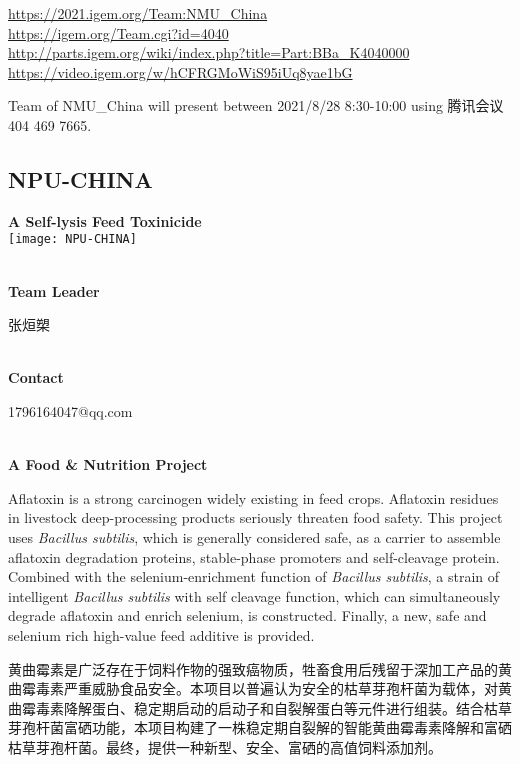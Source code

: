 \url{https://2021.igem.org/Team:NMU\_China }\\
\url{https://igem.org/Team.cgi?id=4040 }\\
\url{http://parts.igem.org/wiki/index.php?title=Part:BBa_K4040000 }\\
\url{https://video.igem.org/w/hCFRGMoWiS95iUq8yae1bG }\\

\vfill{}









Team of NMU\_China will present between    2021/8/28 8:30-10:00     using 腾讯会议 404 469 7665.
\newpage


\subsection{\textcolor{Blu}{ NPU-CHINA } }
\vspace{5mm}
\begin{center}
\large{
  \textbf{ A Self-lysis Feed Toxinicide }\\

  \texttt{[image: NPU-CHINA]}
}
\end{center}
\textbf{\\Team Leader}

  张烜槊


\textbf{\\Contact}

  1796164047@qq.com


\textbf{\\A Food & Nutrition Project\\}\begin{spacing}{1.5}

Aflatoxin is a strong carcinogen widely existing in feed crops. Aflatoxin residues in livestock deep-processing products seriously threaten food safety. This project uses \textit{Bacillus subtilis}, which is generally considered safe, as a carrier to assemble aflatoxin degradation proteins, stable-phase promoters and self-cleavage protein. Combined with the selenium-enrichment function of \textit{Bacillus subtilis}, a strain of intelligent \textit{Bacillus subtilis} with self cleavage function, which can simultaneously degrade aflatoxin and enrich selenium, is constructed. Finally, a new, safe and selenium rich high-value feed additive is provided.

黄曲霉素是广泛存在于饲料作物的强致癌物质，牲畜食用后残留于深加工产品的黄曲霉毒素严重威胁食品安全。本项目以普遍认为安全的枯草芽孢杆菌为载体，对黄曲霉毒素降解蛋白、稳定期启动的启动子和自裂解蛋白等元件进行组装。结合枯草芽孢杆菌富硒功能，本项目构建了一株稳定期自裂解的智能黄曲霉毒素降解和富硒枯草芽孢杆菌。最终，提供一种新型、安全、富硒的高值饲料添加剂。\end{spacing}
\\

